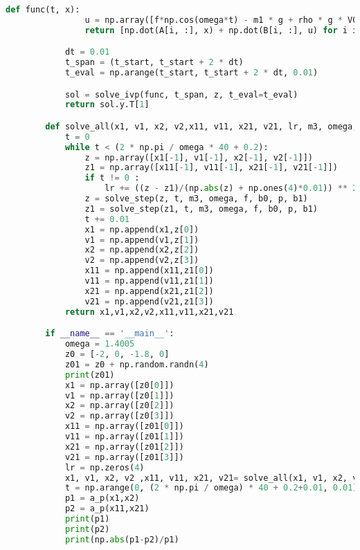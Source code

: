 \documentclass[withoutpreface,bwprint]{cumcmthesis} %
\begin{document}
\begin{appendices}
\begin{lstlisting}[language=python]
            def func(t, x):
                u = np.array([f*np.cos(omega*t) - m1 * g + rho * g * V0 - (p * b0 * abs(dv) ** (p+1)) - k * x0, - m2 * g + (p * b0 * abs(dv) ** (p+1)) + k * x0])
                return [np.dot(A[i, :], x) + np.dot(B[i, :], u) for i in range(4)]

            dt = 0.01
            t_span = (t_start, t_start + 2 * dt)
            t_eval = np.arange(t_start, t_start + 2 * dt, 0.01)

            sol = solve_ivp(func, t_span, z, t_eval=t_eval)
            return sol.y.T[1]

        def solve_all(x1, v1, x2, v2,x11, v11, x21, v21, lr, m3, omega, f, b0:float, p:float, b1:float):
            t = 0
            while t < (2 * np.pi / omega * 40 + 0.2):
                z = np.array([x1[-1], v1[-1], x2[-1], v2[-1]])
                z1 = np.array([x11[-1], v11[-1], x21[-1], v21[-1]])
                if t != 0 :
                    lr += ((z - z1)/(np.abs(z) + np.ones(4)*0.01)) ** 2
                z = solve_step(z, t, m3, omega, f, b0, p, b1)
                z1 = solve_step(z1, t, m3, omega, f, b0, p, b1)
                t += 0.01
                x1 = np.append(x1,z[0])
                v1 = np.append(v1,z[1])
                x2 = np.append(x2,z[2])
                v2 = np.append(v2,z[3])
                x11 = np.append(x11,z1[0])
                v11 = np.append(v11,z1[1])
                x21 = np.append(x21,z1[2])
                v21 = np.append(v21,z1[3])
            return x1,v1,x2,v2,x11,v11,x21,v21

        if __name__ == '__main__':
            omega = 1.4005
            z0 = [-2, 0, -1.8, 0]
            z01 = z0 + np.random.randn(4)
            print(z01)
            x1 = np.array([z0[0]])
            v1 = np.array([z0[1]])
            x2 = np.array([z0[2]])
            v2 = np.array([z0[3]])
            x11 = np.array([z01[0]])
            v11 = np.array([z01[1]])
            x21 = np.array([z01[2]])
            v21 = np.array([z01[3]])
            lr = np.zeros(4)
            x1, v1, x2, v2 ,x11, v11, x21, v21= solve_all(x1, v1, x2, v2,x11, v11, x21, v21, lr, m3=1335.535, f=6250, omega=1.4005, b0=10000, p=0.5, b1=656.3616)
            t = np.arange(0, (2 * np.pi / omega) * 40 + 0.2+0.01, 0.01)
            p1 = a_p(x1,x2)
            p2 = a_p(x11,x21)
            print(p1)
            print(p2)
            print(np.abs(p1-p2)/p1)

        \end{lstlisting}
    \end{appendices}
\end{document}
